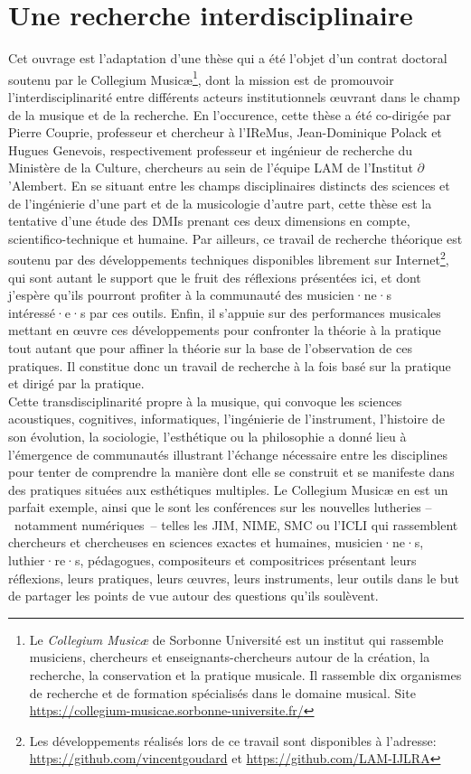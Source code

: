 \section{Une recherche interdisciplinaire}

\noindent Cet ouvrage est l'adaptation d'une thèse qui a été l'objet d'un contrat doctoral soutenu par le Collegium Musicæ\footnote{Le \textit{Collegium Musicæ} de Sorbonne Université est un institut qui rassemble musiciens, chercheurs et enseignants-chercheurs autour de la création, la recherche, la conservation et la pratique musicale. Il rassemble dix organismes de recherche et de formation spécialisés dans le domaine musical. Site \url{https://collegium-musicae.sorbonne-universite.fr/}}, dont la mission est de promouvoir l'interdisciplinarité entre différents acteurs institutionnels œuvrant dans le champ de la musique et de la recherche. En l'occurence, cette thèse a été co-dirigée par Pierre Couprie, professeur et chercheur à l'\gls{IReMus}, Jean-Dominique Polack et Hugues Genevois, respectivement professeur et ingénieur de recherche du Ministère de la Culture, chercheurs au sein de l'équipe \gls{LAM} de l'Institut $\partial$'Alembert. En se situant entre les champs disciplinaires distincts des sciences et de l'ingénierie d'une part et de la musicologie d'autre part, cette thèse est la tentative d'une étude des \glspl{DMI} prenant ces deux dimensions en compte, scientifico-technique et humaine. Par ailleurs, ce travail de recherche théorique est soutenu par des développements techniques disponibles librement sur Internet\footnote{Les développements réalisés lors de ce travail sont disponibles à l'adresse: \url{https://github.com/vincentgoudard} et \url{https://github.com/LAM-IJLRA}}, qui sont autant le support que le fruit des réflexions présentées ici, et dont j'espère qu'ils pourront profiter à la communauté des musicien·ne·s intéressé·e·s par ces outils. Enfin, il s'appuie sur des performances musicales mettant en œuvre ces développements pour confronter la théorie à la pratique tout autant que pour affiner la théorie sur la base de l'observation de ces pratiques. Il constitue donc un travail de recherche à la fois basé sur la pratique et dirigé par la pratique.\\
\indent Cette transdisciplinarité propre à la musique, qui convoque les sciences acoustiques, cognitives, informatiques, l'ingénierie de l'instrument, l'histoire de son évolution, la sociologie, l'esthétique ou la philosophie a donné lieu à l'émergence de communautés illustrant l'échange nécessaire entre les disciplines pour tenter de comprendre la manière dont elle se construit et se manifeste dans des pratiques situées aux esthétiques multiples. Le Collegium Musicæ en est un parfait exemple, ainsi que le sont les conférences sur les nouvelles lutheries --~notamment numériques~-- telles les \gls{JIM}, \gls{NIME}, \gls{SMC} ou l'\gls{ICLI} qui rassemblent chercheurs et chercheuses en sciences exactes et humaines, musicien·ne·s, luthier·re·s, pédagogues, compositeurs et compositrices présentant leurs réflexions, leurs pratiques, leurs œuvres, leurs instruments, leur outils dans le but de partager les points de vue autour des questions qu'ils soulèvent.


